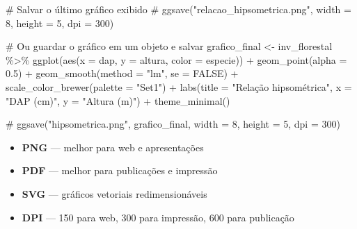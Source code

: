 \documentclass[
  letterpaper,
]{scrbook}
\newenvironment{Shaded}{\begin{snugshade}}{\end{snugshade}}
\newcommand{\AttributeTok}[1]{\textcolor[rgb]{0.40,0.45,0.13}{#1}}
\newcommand{\CommentTok}[1]{\textcolor[rgb]{0.37,0.37,0.37}{#1}}
\newcommand{\ConstantTok}[1]{\textcolor[rgb]{0.56,0.35,0.01}{#1}}
\newcommand{\FloatTok}[1]{\textcolor[rgb]{0.68,0.00,0.00}{#1}}
\newcommand{\FunctionTok}[1]{\textcolor[rgb]{0.28,0.35,0.67}{#1}}
\newcommand{\NormalTok}[1]{\textcolor[rgb]{0.00,0.23,0.31}{#1}}
\newcommand{\OtherTok}[1]{\textcolor[rgb]{0.00,0.23,0.31}{#1}}
\newcommand{\SpecialCharTok}[1]{\textcolor[rgb]{0.37,0.37,0.37}{#1}}
\newcommand{\StringTok}[1]{\textcolor[rgb]{0.13,0.47,0.30}{#1}}
\providecommand{\tightlist}{%
  \setlength{\itemsep}{0pt}\setlength{\parskip}{0pt}}
\begin{document}
\begin{Shaded}
\begin{Highlighting}[]
\CommentTok{\# Salvar o último gráfico exibido}
\CommentTok{\# ggsave("relacao\_hipsometrica.png", width = 8, height = 5, dpi = 300)}

\CommentTok{\# Ou guardar o gráfico em um objeto e salvar}
\NormalTok{grafico\_final }\OtherTok{\textless{}{-}}\NormalTok{ inv\_florestal }\SpecialCharTok{\%\textgreater{}\%}
  \FunctionTok{ggplot}\NormalTok{(}\FunctionTok{aes}\NormalTok{(}\AttributeTok{x =}\NormalTok{ dap, }\AttributeTok{y =}\NormalTok{ altura, }\AttributeTok{color =}\NormalTok{ especie)) }\SpecialCharTok{+}
  \FunctionTok{geom\_point}\NormalTok{(}\AttributeTok{alpha =} \FloatTok{0.5}\NormalTok{) }\SpecialCharTok{+}
  \FunctionTok{geom\_smooth}\NormalTok{(}\AttributeTok{method =} \StringTok{"lm"}\NormalTok{, }\AttributeTok{se =} \ConstantTok{FALSE}\NormalTok{) }\SpecialCharTok{+}
  \FunctionTok{scale\_color\_brewer}\NormalTok{(}\AttributeTok{palette =} \StringTok{"Set1"}\NormalTok{) }\SpecialCharTok{+}
  \FunctionTok{labs}\NormalTok{(}\AttributeTok{title =} \StringTok{"Relação hipsométrica"}\NormalTok{, }\AttributeTok{x =} \StringTok{"DAP (cm)"}\NormalTok{, }\AttributeTok{y =} \StringTok{"Altura (m)"}\NormalTok{) }\SpecialCharTok{+}
  \FunctionTok{theme\_minimal}\NormalTok{()}

\CommentTok{\# ggsave("hipsometrica.png", grafico\_final, width = 8, height = 5, dpi = 300)}
\end{Highlighting}
\end{Shaded}

\begin{tcolorbox}[enhanced jigsaw, arc=.35mm, bottomrule=.15mm, bottomtitle=1mm, breakable, colback=white, colbacktitle=quarto-callout-tip-color!10!white, colframe=quarto-callout-tip-color-frame, coltitle=black, left=2mm, leftrule=.75mm, opacityback=0, opacitybacktitle=0.6, rightrule=.15mm, title=\textcolor{quarto-callout-tip-color}{\faLightbulb}\hspace{0.5em}{Formatos e resolução}, titlerule=0mm, toprule=.15mm, toptitle=1mm]

\begin{itemize}
\tightlist
\item
  \textbf{PNG} --- melhor para web e apresentações
\item
  \textbf{PDF} --- melhor para publicações e impressão
\item
  \textbf{SVG} --- gráficos vetoriais redimensionáveis
\item
  \textbf{DPI} --- 150 para web, 300 para impressão, 600 para publicação
\end{itemize}

\end{tcolorbox}
\end{document}
